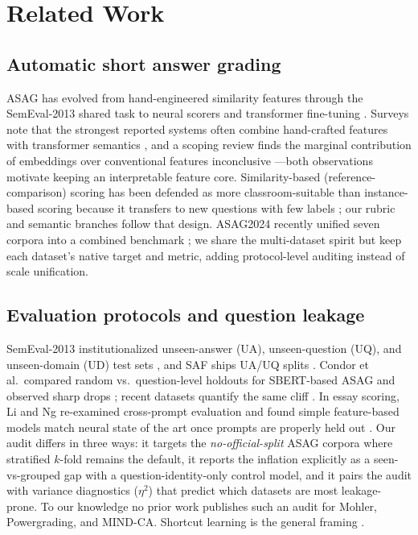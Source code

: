 \documentclass[11pt]{article}
\begin{document}
\section{Related Work}
\label{sec:related}

\subsection{Automatic short answer grading}
ASAG has evolved from hand-engineered similarity features
\cite{mohler2011learning,sultan2016fast,burrows2015eras} through the
SemEval-2013 shared task \cite{dzikovska2013semeval} to neural scorers
\cite{riordan2017investigating} and transformer fine-tuning
\cite{sung2019improving,sung2019pretraining,camus2020investigating}. Surveys
note that the strongest reported systems often combine hand-crafted features
with transformer semantics \cite{haller2022survey}, and a scoping review finds
the marginal contribution of embeddings over conventional features inconclusive
\cite{putnikovic2023embeddings}---both observations motivate keeping an
interpretable feature core. Similarity-based (reference-comparison) scoring has
been defended as more classroom-suitable than instance-based scoring because it
transfers to new questions with few labels \cite{bexte2022similarity,
bexte2023similarity}; our rubric and semantic branches follow that design.
ASAG2024 recently unified seven corpora into a combined benchmark
\cite{meyer2024asag2024}; we share the multi-dataset spirit but keep each
dataset's native target and metric, adding protocol-level auditing instead of
scale unification.

\subsection{Evaluation protocols and question leakage}
SemEval-2013 institutionalized unseen-answer (UA), unseen-question (UQ), and
unseen-domain (UD) test sets \cite{dzikovska2013semeval}, and SAF ships UA/UQ
splits \cite{filighera2022your}. Condor et al.\ compared random vs.\
question-level holdouts for SBERT-based ASAG and observed sharp drops
\cite{condor2021automatic}; recent datasets quantify the same cliff
\cite{aggarwal2024engsaf}. In essay scoring, Li and Ng re-examined cross-prompt
evaluation and found simple feature-based models match neural state of the art
once prompts are properly held out \cite{li2024conundrums}. Our audit differs
in three ways: it targets the \emph{no-official-split} ASAG corpora where
stratified $k$-fold remains the default, it reports the inflation explicitly as
a seen-vs-grouped gap with a question-identity-only control model, and it pairs
the audit with variance diagnostics ($\eta^2$) that predict which datasets are
most leakage-prone. To our knowledge no prior work publishes such an audit for
Mohler, Powergrading, and MIND-CA. Shortcut learning is the general framing
\cite{geirhos2020shortcut}.
\end{document}
